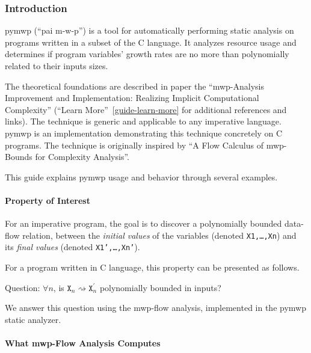 \subsubsection{Introduction}\label{guide-introduction}

pymwp (\enquote{pai m-w-p}) is a tool for automatically performing static analysis on programs written in a subset of the C language.
It analyzes resource usage and determines if program variables' growth rates are no more than polynomially related to their inputs sizes.

The theoretical foundations are described in paper the \enquote{mwp-Analysis Improvement and Implementation: Realizing Implicit Computational Complexity} (\cf \enquote{Learn More}~\autoref{guide-learn-more} for additional references and links).
The technique is generic and applicable to any imperative language.
pymwp is an implementation demonstrating this technique concretely on C programs.
The technique is originally inspired by \enquote{A Flow Calculus of mwp-Bounds for Complexity Analysis}.

This guide explains pymwp usage and behavior through several examples.

\paragraph{Property of Interest}

For an imperative program, the goal is to discover a polynomially
bounded data-flow relation, between the \emph{initial values} of the
variables (denoted \texttt{X1,\ldots{},Xn}) and its \emph{final values}
(denoted \texttt{X1',\ldots{},Xn'}).

For a program written in C language, this property can be presented as
follows.

\begin{minipage}{\textwidth}

\end{minipage}

Question: \(\forall n\), is \(\texttt{X}_n \rightsquigarrow \texttt{X}_n^\prime\) polynomially bounded in inputs?

We answer this question using the mwp-flow analysis, implemented in the pymwp static analyzer.

\paragraph{What mwp-Flow Analysis Computes}

